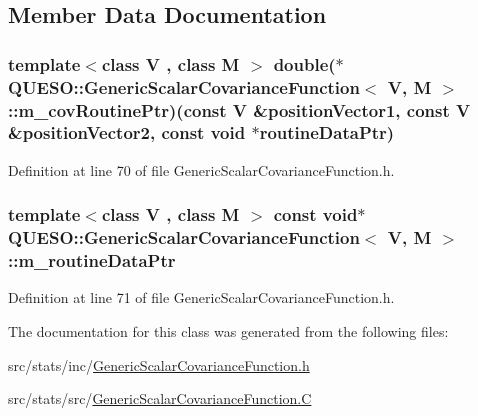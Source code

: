 \subsection{Member Data Documentation}
\hypertarget{class_q_u_e_s_o_1_1_generic_scalar_covariance_function_a5ab019180d841614bc6c6c957be91f93}{
\subsubsection[{m\-\_\-cov\-Routine\-Ptr}]{\setlength{\rightskip}{0pt plus 5cm}template$<$class V , class M $>$ double($\ast$ {\bf Q\-U\-E\-S\-O\-::\-Generic\-Scalar\-Covariance\-Function}$<$ V, M $>$\-::m\-\_\-cov\-Routine\-Ptr)(const V \&position\-Vector1, const V \&position\-Vector2, const void $\ast$routine\-Data\-Ptr)\hspace{0.3cm}{\ttfamily [protected]}}}\label{class_q_u_e_s_o_1_1_generic_scalar_covariance_function_a5ab019180d841614bc6c6c957be91f93}


Definition at line 70 of file Generic\-Scalar\-Covariance\-Function.\-h.

\hypertarget{class_q_u_e_s_o_1_1_generic_scalar_covariance_function_ac09d3c5de0ca3e00e2ee16f7654c8da6}{
\subsubsection[{m\-\_\-routine\-Data\-Ptr}]{\setlength{\rightskip}{0pt plus 5cm}template$<$class V , class M $>$ const void$\ast$ {\bf Q\-U\-E\-S\-O\-::\-Generic\-Scalar\-Covariance\-Function}$<$ V, M $>$\-::m\-\_\-routine\-Data\-Ptr\hspace{0.3cm}{\ttfamily [protected]}}}\label{class_q_u_e_s_o_1_1_generic_scalar_covariance_function_ac09d3c5de0ca3e00e2ee16f7654c8da6}


Definition at line 71 of file Generic\-Scalar\-Covariance\-Function.\-h.



The documentation for this class was generated from the following files\-:\begin{DoxyCompactItemize}
\item 
src/stats/inc/\hyperlink{_generic_scalar_covariance_function_8h}{Generic\-Scalar\-Covariance\-Function.\-h}\item 
src/stats/src/\hyperlink{_generic_scalar_covariance_function_8_c}{Generic\-Scalar\-Covariance\-Function.\-C}\end{DoxyCompactItemize}
